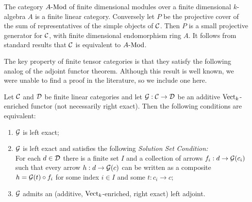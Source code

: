 \documentclass{amsart}
\begin{document}
\begin{remark} The category $\Mod{A}{}$ of finite dimensional modules over a finite dimensional $k$-algebra $A$ is a finite linear category. Conversely let $P$ be the projective cover of the sum of representatives of the simple objects of $\mathcal C$. Then $P$ is a small projective generator for $\mathcal C$, with finite dimensional endomorphism ring $A$. It follows from standard results \cite[Ex. 4-F]{MR0166240} that $\mathcal C$ is equivalent to $\Mod{A}{}$.
\end{remark}

The key property of finite tensor categories is that they satisfy the following analog of the adjoint functor theorem.  Although this result is well known, we were unable to find a proof in the literature, so we include one here.

\begin{proposition} \label{prop:AFT}
	Let $\mathcal C$ and $\mathcal D$ be finite linear categories and let $\mathcal G: \mathcal C \rightarrow \mathcal D$  be an additive $\mathrm{Vect}_k$-enriched functor (not necessarily right exact). Then the following conditions are equivalent: 
	\begin{enumerate}
		\item $\mathcal G$ is left exact;  
		\item $\mathcal G$ is left exact and satisfies the following {\em Solution Set Condition:} \\  For each $d \in \mathcal D$ there is a finite set $I$ and a collection of arrows $f_i:d \to \mathcal G(c_i)$ such that every arrow $h:d \to \mathcal G(c)$ can be written as a composite $h = \mathcal G(t) \circ f_i$ for some index $i \in I$ and some $t: c_i \to c$; 
		\item $\mathcal G$ admits an (additive, ${\mathrm{Vect}_k}$-enriched, right exact) left adjoint.
	\end{enumerate}
\end{proposition}
\end{document}
